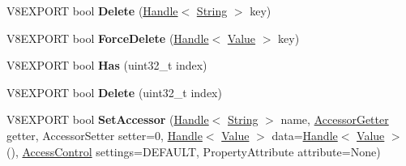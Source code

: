 \begin{DoxyCompactItemize}
\item 
\hypertarget{classv8_1_1_object_aec3bd916e6796e7d1b4cda31874c963d}{}V8\+E\+X\+P\+O\+R\+T bool {\bfseries Delete} (\hyperlink{classv8_1_1_handle}{Handle}$<$ \hyperlink{classv8_1_1_string}{String} $>$ key)\label{classv8_1_1_object_aec3bd916e6796e7d1b4cda31874c963d}

\item 
\hypertarget{classv8_1_1_object_ac7d6916233e21ca58c623793da89d578}{}V8\+E\+X\+P\+O\+R\+T bool {\bfseries Force\+Delete} (\hyperlink{classv8_1_1_handle}{Handle}$<$ \hyperlink{classv8_1_1_value}{Value} $>$ key)\label{classv8_1_1_object_ac7d6916233e21ca58c623793da89d578}

\item 
\hypertarget{classv8_1_1_object_a12a53d31423d7da6da3960cde76bfea5}{}V8\+E\+X\+P\+O\+R\+T bool {\bfseries Has} (uint32\+\_\+t index)\label{classv8_1_1_object_a12a53d31423d7da6da3960cde76bfea5}

\item 
\hypertarget{classv8_1_1_object_a67efb8fba62c35fec415977d2ec12ae3}{}V8\+E\+X\+P\+O\+R\+T bool {\bfseries Delete} (uint32\+\_\+t index)\label{classv8_1_1_object_a67efb8fba62c35fec415977d2ec12ae3}

\item 
\hypertarget{classv8_1_1_object_aeba9bd0dd01a04a35c63763ea650c83c}{}V8\+E\+X\+P\+O\+R\+T bool {\bfseries Set\+Accessor} (\hyperlink{classv8_1_1_handle}{Handle}$<$ \hyperlink{classv8_1_1_string}{String} $>$ name, \hyperlink{namespacev8_a3016fe071826349d1370a700e71be094}{Accessor\+Getter} getter, Accessor\+Setter setter=0, \hyperlink{classv8_1_1_handle}{Handle}$<$ \hyperlink{classv8_1_1_value}{Value} $>$ data=\hyperlink{classv8_1_1_handle}{Handle}$<$ \hyperlink{classv8_1_1_value}{Value} $>$(), \hyperlink{namespacev8_a31d8355cb043d7d2dda3f4a52760b64e}{Access\+Control} settings=D\+E\+F\+A\+U\+L\+T, Property\+Attribute attribute=None)\label{classv8_1_1_object_aeba9bd0dd01a04a35c63763ea650c83c}


\end{DoxyCompactItemize}
